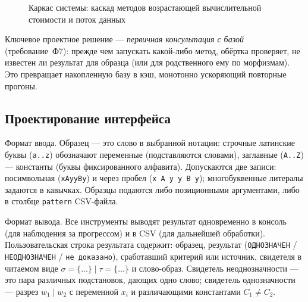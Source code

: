 \documentclass[14pt, russian]{scrartcl}
\begin{document}
\begin{figure}[ht]
\caption{Каркас системы: каскад методов возрастающей вычислительной стоимости и поток
данных}
\label{fig:pipeline}
\end{figure}

Ключевое проектное решение --- \textit{первичная консультация с базой} (требование~Ф7):
прежде чем запускать какой-либо метод, обёртка проверяет, не известен ли результат для
образца (или для родственного ему по морфизмам). Это превращает накопленную базу в
кэш, монотонно ускоряющий повторные прогоны.

\subsection{Проектирование интерфейса}
\label{sec:iface}

Формат ввода. Образец --- это слово в выбранной нотации: строчные латинские
буквы (\texttt{a..z}) обозначают переменные (подставляются словами), заглавные
(\texttt{A..Z}) --- константы (буквы фиксированного алфавита). Допускаются две записи:
посимвольная (\texttt{xAyyBy}) и через пробел (\texttt{x A y y B y}); многобуквенные
литералы задаются в кавычках. Образцы подаются либо позиционными аргументами, либо
в столбце \texttt{pattern} CSV-файла.

Формат вывода. Все инструменты выводят результат одновременно в консоль (для
наблюдения за прогрессом) и в CSV (для дальнейшей обработки). Пользовательская строка
результата содержит: образец, результат (\texttt{ОДНОЗНАЧЕН} / \texttt{НЕОДНОЗНАЧЕН} /
\texttt{не доказано}), сработавший критерий или источник, свидетеля в читаемом виде
$\sigma = \{\dots\}\mid\tau = \{\dots\}$ и слово-образ. Свидетель неоднозначности ---
это пара различных подстановок, дающих одно слово; свидетель однозначности --- разрез
$w_1\mid w_2$ с переменной $x_i$ и различающими константами $C_1\neq C_2$.
\end{document}
